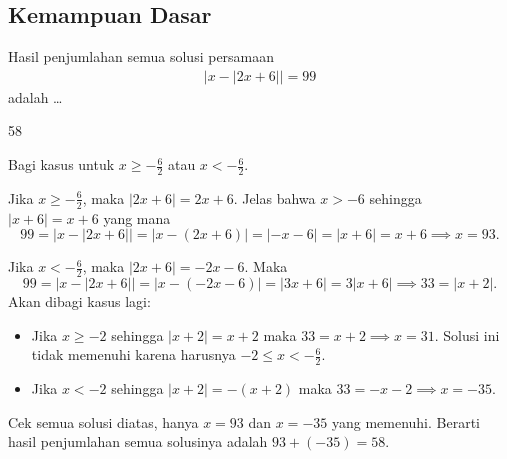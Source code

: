 \subsection{Kemampuan Dasar}
\begin{soalbaru}
Hasil penjumlahan semua solusi persamaan
\begin{align*}
|x-|2x+6||=99
\end{align*}
adalah \dots
\end{soalbaru}
\begin{jawaban}
58
\end{jawaban}
\begin{solusi}
Bagi kasus untuk $x \ge -\tfrac{6}{2}$ atau $x < -\tfrac{6}{2}$.

Jika $x \ge -\tfrac{6}{2}$, maka $|2x+6| = 2x+6$. Jelas bahwa $x > -6$ sehingga $|x+6|=x+6$ yang mana
$$99=|x-|2x+6||=|x-(2x+6)|=|-x-6|=|x+6|=x+6 \implies x = 93.$$

Jika $x < -\tfrac{6}{2}$, maka $|2x+6| = -2x-6$. Maka
$$99=|x-|2x+6||=|x-(-2x-6)|=|3x+6|=3|x+6| \implies 33=|x+2|.$$
Akan dibagi kasus lagi:
\begin{itemize}
\item Jika $x \ge -2$ sehingga $|x+2|=x+2$ maka $33=x+2 \implies x=31$. Solusi ini tidak memenuhi karena harusnya $-2 \le x < -\tfrac{6}{2}$.
\item Jika $x < -2$ sehingga $|x+2|=-(x+2)$ maka $33=-x-2 \implies x=-35$.
\end{itemize}
Cek semua solusi diatas, hanya $x=93$ dan $x=-35$ yang memenuhi. Berarti hasil penjumlahan semua solusinya adalah $93+(-35)=\boxed{58}$.

\end{solusi}

